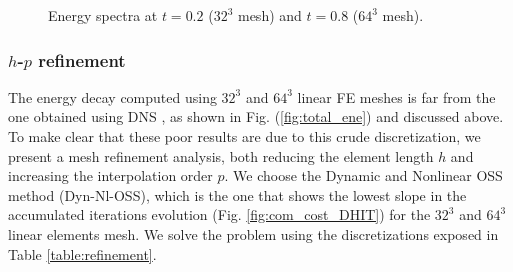 \begin{figure}[h!]
  \centering
  \caption{Energy spectra at $t=0.2$ ($32^3$ mesh) and $t=0.8$ ($64^3$ mesh).}
  \label{fig:spec_32_64}
\end{figure}

\subsubsection{$h$-$p$ refinement}

The energy decay computed using $32^3$ and $64^3$ linear FE meshes is far from the one obtained using DNS \cite{_selection_????}, as shown in Fig. (\ref{fig:total_ene}) and discussed above. To make clear that these poor results are due to this crude discretization,
we present a mesh refinement analysis, both reducing the element length $h$ and increasing the interpolation order $p$.
We choose the Dynamic and Nonlinear OSS method (Dyn-Nl-OSS), which is the one that shows the lowest slope in the accumulated iterations evolution (Fig. \ref{fig:com_cost_DHIT}) for the $32^3$ and $64^3$ linear elements mesh. We solve the problem using the discretizations exposed in Table \ref{table:refinement}.

